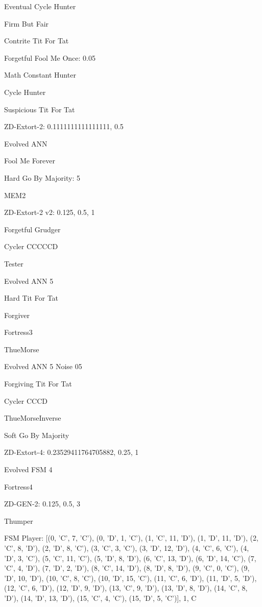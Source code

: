 \item Eventual Cycle Hunter
\item Firm But Fair
\item Contrite Tit For Tat
\item Forgetful Fool Me Once: 0.05
\item Math Constant Hunter
\item Cycle Hunter
\item Suspicious Tit For Tat
\item ZD-Extort-2: 0.1111111111111111, 0.5
\item Evolved ANN
\item Fool Me Forever
\item Hard Go By Majority: 5
\item MEM2
\item ZD-Extort-2 v2: 0.125, 0.5, 1
\item Forgetful Grudger
\item Cycler CCCCCD
\item Tester
\item Evolved ANN 5
\item Hard Tit For Tat
\item Forgiver
\item Fortress3
\item ThueMorse
\item Evolved ANN 5 Noise 05
\item Forgiving Tit For Tat
\item Cycler CCCD
\item ThueMorseInverse
\item Soft Go By Majority
\item ZD-Extort-4: 0.23529411764705882, 0.25, 1
\item Evolved FSM 4
\item Fortress4
\item ZD-GEN-2: 0.125, 0.5, 3
\item Thumper
\item FSM Player: [(0, 'C', 7, 'C'), (0, 'D', 1, 'C'), (1, 'C', 11, 'D'), (1, 'D', 11, 'D'), (2, 'C', 8, 'D'), (2, 'D', 8, 'C'), (3, 'C', 3, 'C'), (3, 'D', 12, 'D'), (4, 'C', 6, 'C'), (4, 'D', 3, 'C'), (5, 'C', 11, 'C'), (5, 'D', 8, 'D'), (6, 'C', 13, 'D'), (6, 'D', 14, 'C'), (7, 'C', 4, 'D'), (7, 'D', 2, 'D'), (8, 'C', 14, 'D'), (8, 'D', 8, 'D'), (9, 'C', 0, 'C'), (9, 'D', 10, 'D'), (10, 'C', 8, 'C'), (10, 'D', 15, 'C'), (11, 'C', 6, 'D'), (11, 'D', 5, 'D'), (12, 'C', 6, 'D'), (12, 'D', 9, 'D'), (13, 'C', 9, 'D'), (13, 'D', 8, 'D'), (14, 'C', 8, 'D'), (14, 'D', 13, 'D'), (15, 'C', 4, 'C'), (15, 'D', 5, 'C')], 1, C
